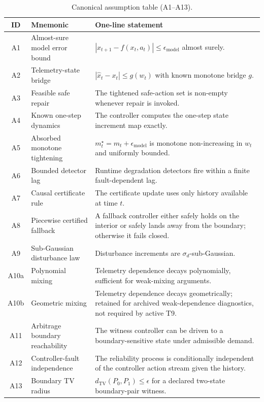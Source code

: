 \begin{table}[htbp]
\centering
\caption{Canonical assumption table (A1--A13).}
\label{tab:assumption-master}
\small
\begin{tabular}{@{}clp{8.0cm}@{}}
\toprule
\textbf{ID} & \textbf{Mnemonic} & \textbf{One-line statement} \\
\midrule
A1 & Almost-sure model error bound & $|x_{t+1} - f(x_t,a_t)| \le \epsilon_{\mathrm{model}}$ almost surely. \\
A2 & Telemetry-state bridge & $|\hat{x}_t - x_t| \le g(w_t)$ with known monotone bridge $g$. \\
A3 & Feasible safe repair & The tightened safe-action set is non-empty whenever repair is invoked. \\
A4 & Known one-step dynamics & The controller computes the one-step state increment map exactly. \\
A5 & Absorbed monotone tightening & $m_t^\star = m_t + \epsilon_{\mathrm{model}}$ is monotone non-increasing in $w_t$ and uniformly bounded. \\
A6 & Bounded detector lag & Runtime degradation detectors fire within a finite fault-dependent lag. \\
A7 & Causal certificate rule & The certificate update uses only history available at time $t$. \\
A8 & Piecewise certified fallback & A fallback controller either safely holds on the interior or safely lands away from the boundary; otherwise it fails closed. \\
A9 & Sub-Gaussian disturbance law & Disturbance increments are $\sigma_d$-sub-Gaussian. \\
A10a & Polynomial mixing & Telemetry dependence decays polynomially, sufficient for weak-mixing arguments. \\
A10b & Geometric mixing & Telemetry dependence decays geometrically; retained for archived weak-dependence diagnostics, not required by active T9. \\
A11 & Arbitrage boundary reachability & The witness controller can be driven to a boundary-sensitive state under admissible demand. \\
A12 & Controller-fault independence & The reliability process is conditionally independent of the controller action stream given the history. \\
A13 & Boundary TV radius & $d_{\mathrm{TV}}(P_0,P_1)\le\epsilon$ for a declared two-state boundary-pair witness. \\
\bottomrule
\end{tabular}
\end{table}

